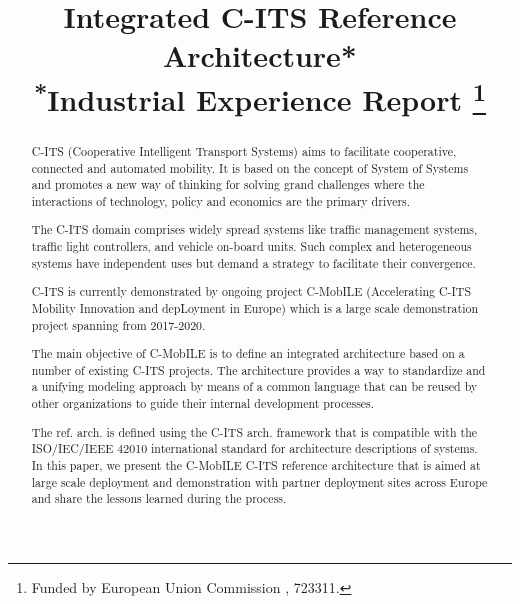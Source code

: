 \documentclass[conference]{IEEEtran}
\begin{document}
\title{Integrated C-ITS Reference Architecture* \\
  {\footnotesize \textsuperscript{*}Industrial Experience Report}
  \thanks{Funded by European Union Commission , 723311.}
}

\author{
}

\maketitle


\begin{abstract}
C-ITS (Cooperative Intelligent Transport Systems) aims to facilitate cooperative, connected and automated mobility.
It is based on the concept of System of Systems and promotes a new way of thinking for solving grand challenges where the interactions of technology, policy and economics are the primary drivers.

The C-ITS domain comprises widely spread systems like traffic management systems, traffic light controllers, and vehicle on-board units. Such complex and heterogeneous systems have independent uses but demand a strategy to facilitate their convergence.

C-ITS is currently demonstrated by ongoing project C-MobILE (Accelerating C-ITS Mobility Innovation and depLoyment in Europe) which is a large scale demonstration project spanning from 2017-2020.

The main objective of C-MobILE is to define an integrated architecture based on a number of existing C-ITS projects.
The architecture provides a way to standardize and a unifying modeling approach by means of a common language that can be reused by other organizations to guide their internal development processes.

The ref. arch. is defined using the C-ITS arch. framework that is compatible with the ISO/IEC/IEEE 42010 \cite{iso42010} international standard for architecture descriptions of systems.
In this paper, we present the C-MobILE C-ITS reference architecture that is aimed at large scale deployment and demonstration with partner deployment sites across Europe and share the lessons learned during the process.
\end{abstract}
\end{document}
